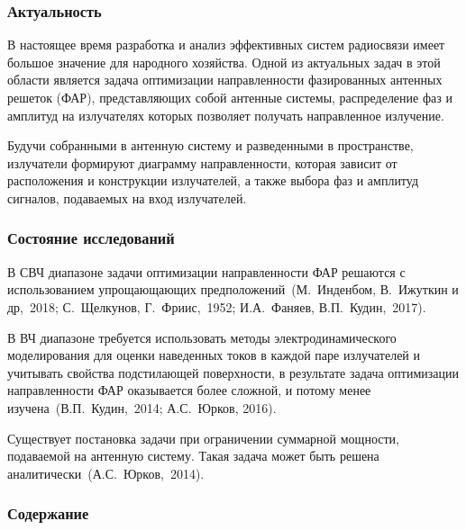 \begin{frame}
    \setcounter{framenumber}{1}
    \maketitle
\end{frame}

\begin{frame}
    \frametitle{Актуальность}
     В настоящее время разработка и анализ эффективных систем радиосвязи имеет большое значение для народного хозяйства. Одной из актуальных задач в этой области является задача оптимизации направленности фазированных антенных решеток (ФАР), представляющих собой антенные системы, распределение фаз и амплитуд на излучателях которых позволяет получать направленное излучение.
    
    \vspace{1em}


    Будучи собранными в антенную систему и разведенными в пространстве, излучатели формируют диаграмму направленности, которая зависит от расположения и конструкции излучателей, а также выбора фаз и амплитуд сигналов, подаваемых на вход излучателей.
\end{frame}

\begin{frame}
    \frametitle{Состояние исследований}
    В СВЧ диапазоне задачи оптимизации направленности ФАР решаются с использованием упрощающающих предположений~(М.~Инденбом, В.~Ижуткин и др,~2018; С.~Щелкунов, Г.~Фриис,~1952; И.А.~Фаняев, В.П.~Кудин,~2017).
    
    \vspace{1em}
    В ВЧ диапазоне требуется использовать методы электродинамического моделирования для оценки наведенных токов в каждой паре излучателей и учитывать свойства подстилающей поверхности, в результате задача оптимизации направленности ФАР оказывается более сложной, и потому менее изучена~(В.П.~Кудин,~2014; А.С.~Юрков, 2016).
    \vspace{1em}
    
    Существует постановка задачи при ограничении суммарной мощности, подаваемой на антенную систему. Такая задача может быть решена аналитически~(А.С.~Юрков,~2014).
\end{frame}
\note{
}

\begin{frame}
    \frametitle{Содержание}
    \tableofcontents
\end{frame}
